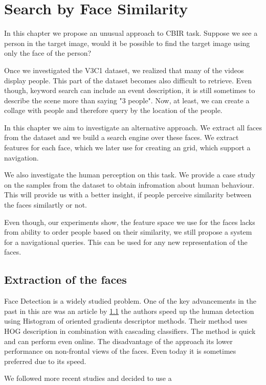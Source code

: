 
\chapter{Search by Face Similarity}

In this chapter we propose an unusual approach to CBIR task. Suppose we see a person in the target image, would it be possible to find the target image using only the face of the person?

Once we investigated the V3C1 dataset, we realized that many of the videos display people. This part of the dataset becomes also difficult to retrieve. Even though, keyword search can include an event description, it is still sometimes to describe the scene more than saying "3 people". Now, at least, we can create a collage with people and therefore query by the location of the people.

In this chapter we aim to investigate an alternative approach. We extract all faces from the dataset and we build a search engine over these faces. We extract features for each face, which we later use for creating an grid, which support a navigation.

We also investigate the human perception on this task. We provide a case study on the samples from the dataset to obtain infromation about human behaviour. This will provide us with a better insight, if people perceive similarity between the faces similartly or not.

Even though, our experiments show, the feature space we use for the faces lacks from ability to order people based on their similarity, we still propose a system for a navigational queries. This can be used for any new representation of the faces.

\section{Extraction of the faces}

Face Detection is a widely studied problem. One of the key advancements in the past in this are was an article by \ref{} the authors speed up the human detection using Histogram of oriented gradients descriptor methods. Their method uses HOG description in combination with cascading classifiers. The method is quick and can perform even online. The disadvantage of the approach its lower performance on non-frontal views of the faces. Even today it is sometimes preferred due to its speed.

We followed more recent studies and decided to use a 

